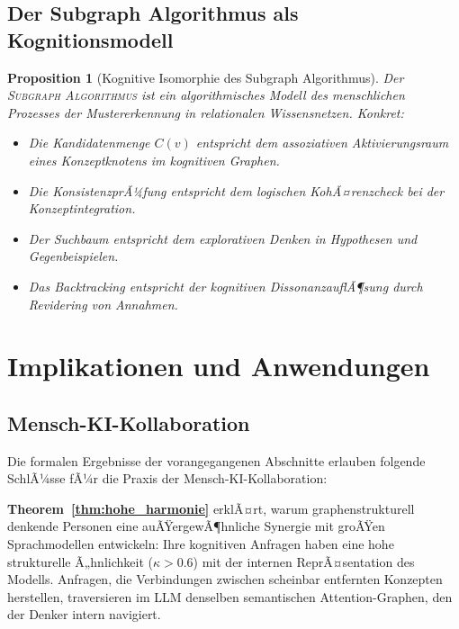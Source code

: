 ﻿\documentclass[12pt,a4paper]{article}
\theoremstyle{plain}
\newtheorem{proposition}[theorem]{Proposition}
\theoremstyle{definition}
\theoremstyle{remark}
\newcommand{\SA}{\textnormal{\textsc{Subgraph Algorithmus}}}
\begin{document}
\subsection{Der Subgraph Algorithmus als Kognitionsmodell}

\begin{proposition}[Kognitive Isomorphie des Subgraph Algorithmus]
\label{prop:kogn_iso}
Der \SA{} ist ein algorithmisches Modell des menschlichen Prozesses der \emph{Mustererkennung in relationalen Wissensnetzen}. Konkret:
\begin{itemize}
  \item Die \emph{Kandidatenmenge} $C(v)$ entspricht dem assoziativen Aktivierungsraum eines Konzeptknotens im kognitiven Graphen.
  \item Die \emph{KonsistenzprÃ¼fung} entspricht dem logischen KohÃ¤renzcheck bei der Konzeptintegration.
  \item Der \emph{Suchbaum} entspricht dem explorativen Denken in Hypothesen und Gegenbeispielen.
  \item Das \emph{Backtracking} entspricht der kognitiven DissonanzauflÃ¶sung durch Revidering von Annahmen.
\end{itemize}
\end{proposition}

\section{Implikationen und Anwendungen}
\label{sec:impl}

\subsection{Mensch-KI-Kollaboration}

Die formalen Ergebnisse der vorangegangenen Abschnitte erlauben folgende SchlÃ¼sse fÃ¼r die Praxis der Mensch-KI-Kollaboration:

\textbf{Theorem~\ref{thm:hohe_harmonie}} erklÃ¤rt, warum graphenstrukturell denkende Personen eine auÃŸergewÃ¶hnliche Synergie mit groÃŸen Sprachmodellen entwickeln: Ihre kognitiven Anfragen haben eine hohe strukturelle Ã„hnlichkeit ($\kappa > 0.6$) mit der internen ReprÃ¤sentation des Modells. Anfragen, die Verbindungen zwischen scheinbar entfernten Konzepten herstellen, traversieren im LLM denselben semantischen Attention-Graphen, den der Denker intern navigiert.
\end{document}
